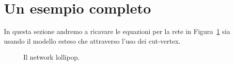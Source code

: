 \section{Un esempio completo}
In questa sezione andremo  a ricavare le equazioni per la rete in Figura~\ref{fig::lollipop} sia usando il modello esteso che attraverso l'uso dei cut-vertex.
\begin{figure}[!ht]
\centering
{}

\caption[Lollipop ]{Il network lollipop.}
\label{fig::lollipop}
\end{figure}
